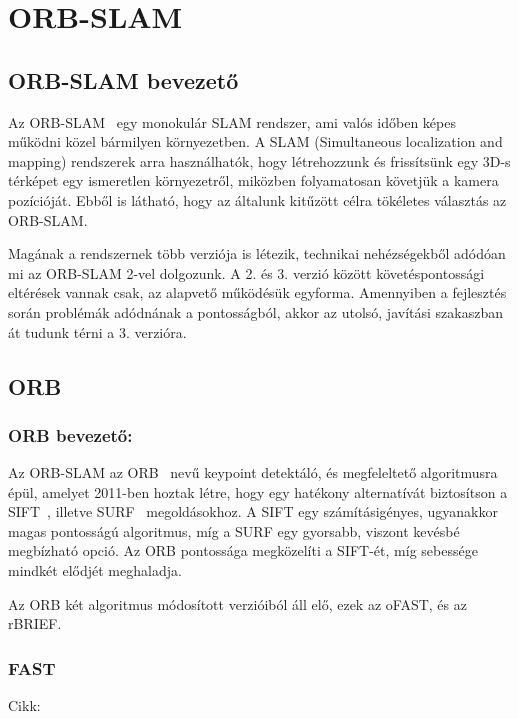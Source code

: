 \section{ORB-SLAM}

\subsection{ORB-SLAM bevezető}

Az ORB-SLAM~\cite{7219438} egy monokulár SLAM rendszer, ami valós időben képes működni közel bármilyen környezetben. 
A SLAM (Simultaneous localization and mapping) rendszerek arra használhatók, hogy létrehozzunk és frissítsünk egy 3D-s térképet egy ismeretlen környezetről, miközben folyamatosan követjük a kamera pozícióját. 
Ebből is látható, hogy az általunk kitűzött célra tökéletes választás az ORB-SLAM.

Magának a rendszernek több verziója is létezik, technikai nehézségekből adódóan mi az ORB-SLAM 2-vel dolgozunk. 
A 2. és 3. verzió között követéspontossági eltérések vannak csak, az alapvető működésük egyforma. 
Amennyiben a fejlesztés során problémák adódnának a pontosságból, akkor az utolsó, javítási szakaszban át tudunk térni a 3. verzióra.

\subsection{ORB}

\subsubsection{ORB bevezető:}

Az ORB-SLAM az ORB~\cite{rublee2011orb} nevű keypoint detektáló, és megfeleltető algoritmusra épül, amelyet 2011-ben hoztak létre, hogy egy hatékony alternatívát biztosítson a SIFT~\cite{lowe2004distinctive}, illetve SURF~\cite{bay2006surf} megoldásokhoz.
A SIFT egy számításigényes, ugyanakkor magas pontosságú algoritmus, míg a SURF egy gyorsabb, viszont kevésbé megbízható opció.
Az ORB pontossága megközelíti a SIFT-ét, míg sebessége mindkét elődjét meghaladja.

Az ORB két algoritmus módosított verzióiból áll elő, ezek az oFAST, és az rBRIEF.

\subsubsection{FAST}

Cikk:\cite{rosten2006machine}


